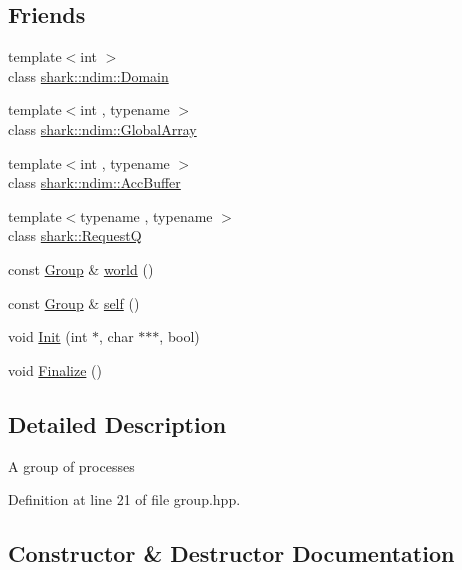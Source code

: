 \subsection*{Friends}
\begin{DoxyCompactItemize}
\item 
{\footnotesize template$<$int $>$ }\\class \hyperlink{classshark_1_1_group_a0c647ce15d76f9253c6236ffa219ee33}{shark\+::ndim\+::\+Domain}
\item 
{\footnotesize template$<$int , typename $>$ }\\class \hyperlink{classshark_1_1_group_a8a5e7aad8bd5339747078692740c0a59}{shark\+::ndim\+::\+Global\+Array}
\item 
{\footnotesize template$<$int , typename $>$ }\\class \hyperlink{classshark_1_1_group_aaf0e46addc08f50274723b3ec7cfa1c7}{shark\+::ndim\+::\+Acc\+Buffer}
\item 
{\footnotesize template$<$typename , typename $>$ }\\class \hyperlink{classshark_1_1_group_af2ebd450d7dfe66c0e03093941a9f357}{shark\+::\+RequestQ}
\item 
const \hyperlink{classshark_1_1_group}{Group} \& \hyperlink{classshark_1_1_group_ab2389cee4068fd386c970669a3beb2c0}{world} ()
\item 
const \hyperlink{classshark_1_1_group}{Group} \& \hyperlink{classshark_1_1_group_a95b2488d732a4032db62c7d423a36dfa}{self} ()
\item 
void \hyperlink{classshark_1_1_group_adba66a23d3a48c8a7accb2e0f15ac133}{Init} (int $\ast$, char $\ast$$\ast$$\ast$, bool)
\item 
void \hyperlink{classshark_1_1_group_a8fee61d7a783cade1a3d07fe86284d27}{Finalize} ()
\end{DoxyCompactItemize}


\subsection{Detailed Description}
A group of processes 

Definition at line 21 of file group.\+hpp.



\subsection{Constructor \& Destructor Documentation}
\hypertarget{classshark_1_1_group_a2222ee01c6bacb1441428089fb29916a}{}\label{classshark_1_1_group_a2222ee01c6bacb1441428089fb29916a} 
